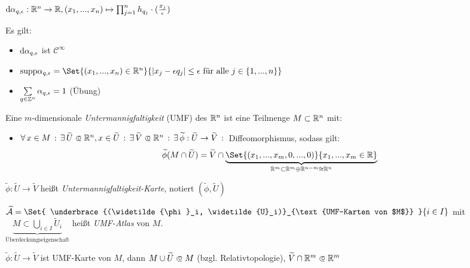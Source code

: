 \documentclass{cheat-sheet}
\newcommand{\Atlas}{\mathcal{A}} %
\begin{document}
$\d \alpha_{q,\epsilon} : \R^n \to \R, (x_1, ..., x_n) \mapsto \prod_{j=1}^{n} h_{q_j} \cdot (\frac{x_j}{\epsilon})$

Es gilt:

\begin{itemize}
  \item $\mathrm{d} \alpha_{q, \epsilon}$ ist $\mathcal{C}^\infty$
  \item $\mathrm{supp} \alpha_{q,\epsilon} = \Set{ (x_1, ..., x_n) \in \R^n }{ \abs{x_j - \epsilon q_j} \leq \epsilon \text{ für alle } j \in \{ 1, ..., n \} }$
  \item $\sum_{q \in \Z^n} \alpha_{q, \epsilon} = 1$ (Übung)
\end{itemize}




\begin{defn}
  Eine $m$-dimensionale \emph{Untermannigfaltigkeit} (UMF) des $\mathbb{R}^n$ ist eine Teilmenge $M \subset \mathbb{R}^n$ mit:
  \begin{itemize}
    \item $\fa{x \in M} \ex{\widetilde{U} \opn \R^n, x \in \widetilde{U}} \ex{\widetilde{V} \opn \R^n} \ex{\widetilde{\phi} : \widetilde{U} \to \widetilde{V}}$ Diffeomorphismus, sodass gilt:
    \[ \widetilde{\phi}(M \cap \widetilde{U}) = \widetilde{V} \cap \underbrace{\Set{ (x_1, ..., x_m, 0, ..., 0) }{ x_1, ..., x_m \in \R }}_{\R^m \subset \R^m \oplus \R^{n-m} \cong \R^n} \]
  \end{itemize}
\end{defn}

\begin{nomenklatur}
  $\widetilde{\phi} : \widetilde{U} \to \widetilde{V}$ heißt \emph{Untermannigfaltigkeit-Karte}, notiert $(\widetilde{\phi}, \widetilde{U})$
\end{nomenklatur}

\begin{defn}
  $\widetilde{\Atlas} = \Set{ \underbrace{(\widetilde{\phi}_i, \widetilde{U}_i)}_{\text{UMF-Karten von $M$}} }{ i \in I }$ mit $\underbrace{M \subset \bigcup_{i \in I} \widetilde{U}_i}_{\text{Überdeckungseigenschaft}}$ heißt \emph{UMF-Atlas} von $M$.
\end{defn}

\begin{beob}
  $\widetilde{\phi} : \widetilde{U} \to \widetilde{V}$ ist UMF-Karte von $M$, dann $M \cup \widetilde{U} \opn M$ (bzgl. Relativtopologie), $\widetilde{V} \cap \R^m \opn \R^m$
\end{beob}
\end{document}
